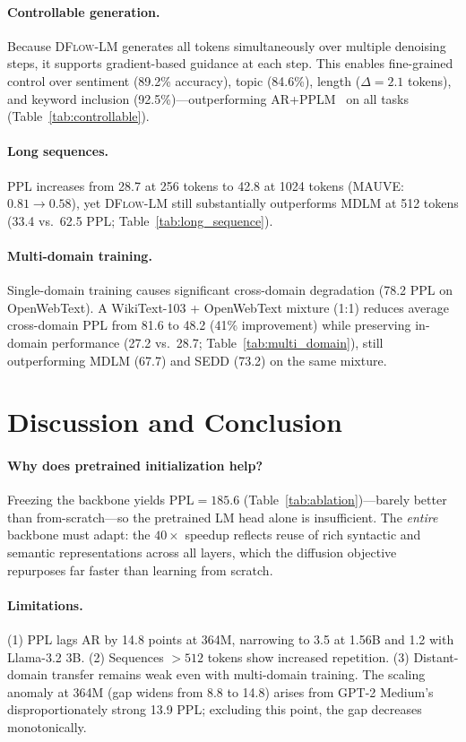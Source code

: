 \documentclass{article}
\newcommand{\ours}{\textsc{DFlow-LM}}
\begin{document}
\paragraph{Controllable generation.}
Because \ours{} generates all tokens simultaneously over multiple denoising steps, it supports gradient-based guidance at each step.
This enables fine-grained control over sentiment (89.2\% accuracy), topic (84.6\%), length ($\Delta{=}2.1$ tokens), and keyword inclusion (92.5\%)---outperforming AR+PPLM~\citep{dathathri2020plug} on all tasks (Table~\ref{tab:controllable}).

\paragraph{Long sequences.}
PPL increases from 28.7 at 256 tokens to 42.8 at 1024 tokens (MAUVE: $0.81 \to 0.58$), yet \ours{} still substantially outperforms MDLM at 512 tokens (33.4 vs.\ 62.5 PPL; Table~\ref{tab:long_sequence}).

\paragraph{Multi-domain training.}
Single-domain training causes significant cross-domain degradation (78.2 PPL on OpenWebText).
A WikiText-103 + OpenWebText mixture (1:1) reduces average cross-domain PPL from 81.6 to 48.2 (41\% improvement) while preserving in-domain performance (27.2 vs.\ 28.7; Table~\ref{tab:multi_domain}), still outperforming MDLM (67.7) and SEDD (73.2) on the same mixture.

\section{Discussion and Conclusion}
\label{sec:discussion}

\paragraph{Why does pretrained initialization help?}
Freezing the backbone yields PPL${=}185.6$ (Table~\ref{tab:ablation})---barely better than from-scratch---so the pretrained LM head alone is insufficient.
The \emph{entire} backbone must adapt: the $40{\times}$ speedup reflects reuse of rich syntactic and semantic representations across all layers, which the diffusion objective repurposes far faster than learning from scratch.

\paragraph{Limitations.}
(1) PPL lags AR by 14.8 points at 364M, narrowing to 3.5 at 1.56B and 1.2 with Llama-3.2 3B.
(2) Sequences ${>}512$ tokens show increased repetition.
(3) Distant-domain transfer remains weak even with multi-domain training.
The scaling anomaly at 364M (gap widens from 8.8 to 14.8) arises from GPT-2 Medium's disproportionately strong 13.9 PPL; excluding this point, the gap decreases monotonically.
\end{document}
